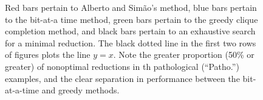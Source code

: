 \begin{figure}
\qquad
{}
\caption{\emph{} {Red} bars pertain to Alberto and Sim\~ao's method, 
{blue} bars pertain to the bit-at-a time method, 
{green} bars pertain to the greedy clique completion method, 
and
{black} bars pertain to an exhaustive search for a minimal reduction.
The black dotted line in the first two rows of figures plots the line $y=x$.  Note the greater
proportion (50\% or greater) of nonoptimal reductions in th
pathological (``Patho.'') examples, and the clear separation in performance between 
the bit-at-a-time and greedy methods.
}
\end{figure}